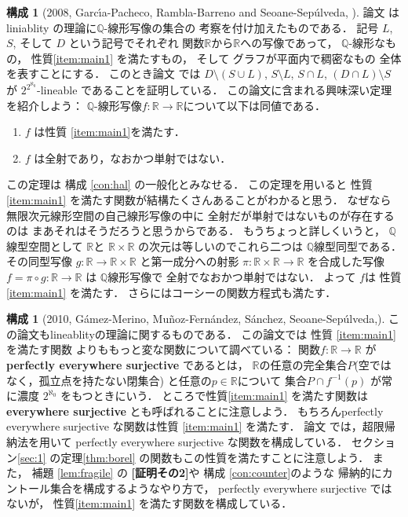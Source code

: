 \documentclass[leqno, a4paper, 12pt]{jsarticle}
\theoremstyle{definition}
\newtheorem{con}[thm]{構成}
\newcommand{\qq}{\mathbb{Q}}
\newcommand{\rr}{\mathbb{R}}
\newcommand{\myco}{2^{\aleph_{0}}}
\newcommand{\mycoco}{2^{2^{\aleph_{0}}}}
\begin{document}
\begin{con}[2008,  Garc\'{\i}a-Pacheco, Rambla-Barreno and Seoane-Sep\'{u}lveda, \cite{MR2420685}]\label{con:gprbss}
論文
\cite{MR2420685}
はliniablity
の理論に$\qq$-線形写像の集合の
考察を付け加えたものである．
記号
$L$, 
$S$, 
そして
$D$
という記号でそれぞれ
関数$\rr$から$\rr$への写像であって，
$\qq$-線形なもの，
性質\ref{item:main1}
を満たすもの，
そして
グラフが平面内で稠密なもの
全体を表すことにする．
このとき論文
\cite{MR2420685}
では
$D\setminus (S\cup L)$, 
$S\setminus L$, 
$S\cap L$, 
$(D\cap L)\setminus S$
が
$\mycoco$-lineable
であることを証明している．
この論文に含まれる興味深い定理を紹介しよう：
$\qq$-線形写像$f\colon \rr\to \rr$について以下は同値である．
\begin{enumerate}[label=\textup{(\arabic*)}]
\item $f$
は性質
\ref{item:main1}を満たす．
\item 
$f$
は全射であり，なおかつ単射ではない．
\end{enumerate}
この定理は
構成
\ref{con:hal}
の一般化とみなせる．
この定理を用いると
性質
\ref{item:main1}
を満たす関数が結構たくさんあることがわかると思う．
なぜなら無限次元線形空間の自己線形写像の中に
全射だが単射ではないものが存在するのは
まあそれはそうだろうと思うからである．
もうちょっと詳しくいうと，
$\qq$線型空間として
$\rr$と
$\rr\times \rr$
の次元は等しいのでこれら二つは
$\qq$線型同型である．
その同型写像
$g\colon \rr\to \rr\times \rr$
と第一成分への射影
$\pi\colon \rr\times \rr\to \rr$
を合成した写像
$f=\pi\circ g\colon \rr\to \rr$
は
$\qq$線形写像で
全射でなおかつ単射ではない．
よって
$f$は
性質
\ref{item:main1}
を満たす．
さらにはコーシーの関数方程式も満たす．
\end{con}

\begin{con}[2010, G\'{a}mez-Merino, Mu\~{n}oz-Fern\'{a}ndez, S\'{a}nchez,  Seoane-Sep\'{u}lveda,]\label{con:gmmfsss}
\quad
この論文もlineablityの理論に関するものである．
この論文\cite[Examples 2.1 and 2.2]{MR2679609}では
性質
\ref{item:main1}
を満たす関数
よりももっと変な関数について調べている：
関数$f\colon \rr\to \rr$
が
\textbf{perfectly everywhere surjective}
であるとは，
$\rr$の任意の完全集合$P$(空ではなく，孤立点を持たない閉集合)
と任意の$p\in \rr$について
集合$P\cap f^{-1}(p)$
が常に濃度
$\myco$
をもつときにいう．
ところで性質\ref{item:main1}
を満たす関数は\textbf{everywhere surjective}
とも呼ばれることに注意しよう．
もちろんperfectly everywhere surjective 
な関数は性質
\ref{item:main1}
を満たす．
論文\cite{MR2679609}
では，超限帰納法を用いて
perfectly everywhere surjective 
な関数を構成している．
セクション\ref{sec:1}
の定理\ref{thm:borel}
の関数もこの性質を満たすことに注意しよう．
また，
補題
\ref{lem:fragile}
の
\textbf{[証明その2]}や
構成
\ref{con:counter}のような
帰納的にカントール集合を構成するようなやり方で，
perfectly everywhere surjective ではないが，
性質\ref{item:main1}
を満たす関数を構成している．
\end{con}
\end{document}

